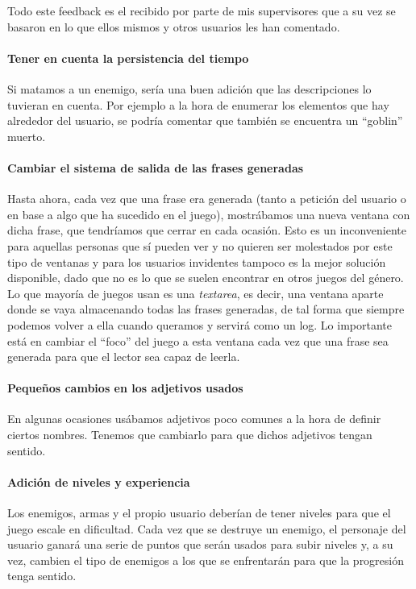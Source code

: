 Todo este feedback es el recibido por parte de mis supervisores que a su vez se basaron en lo que ellos mismos y otros usuarios les han comentado.

\paragraph{Tener en cuenta la persistencia del tiempo} Si matamos a un enemigo, sería una buen adición que las descripciones lo tuvieran en cuenta. Por ejemplo a la hora de enumerar los elementos que hay alrededor del usuario, se podría comentar que también se encuentra un ``goblin'' muerto.

\paragraph{Cambiar el sistema de salida de las frases generadas} Hasta ahora, cada vez que una frase era generada (tanto a petición del usuario o en base a algo que ha sucedido en el juego), mostrábamos una nueva ventana con dicha frase, que tendríamos que cerrar en cada ocasión. Esto es un inconveniente para aquellas personas que sí pueden ver y no quieren ser molestados por este tipo de ventanas y para los usuarios invidentes tampoco es la mejor solución disponible, dado que no es lo que se suelen encontrar en otros juegos del género. Lo que mayoría de juegos usan es una \textit{textarea}, es decir, una ventana aparte donde se vaya almacenando todas las frases generadas, de tal forma que siempre podemos volver a ella cuando queramos y servirá como un log. Lo importante está en cambiar el ``foco'' del juego a esta ventana cada vez que una frase sea generada para que el lector sea capaz de leerla.

\paragraph{Pequeños cambios en los adjetivos usados} En algunas ocasiones usábamos adjetivos poco comunes a la hora de definir ciertos nombres. Tenemos que cambiarlo para que dichos adjetivos tengan sentido.

\paragraph{Adición de niveles y experiencia} Los enemigos, armas y el propio usuario deberían de tener niveles para que el juego escale en dificultad. Cada vez que se destruye un enemigo, el personaje del usuario ganará una serie de puntos que serán usados para subir niveles y, a su vez, cambien el tipo de enemigos a los que se enfrentarán para que la progresión tenga sentido.

